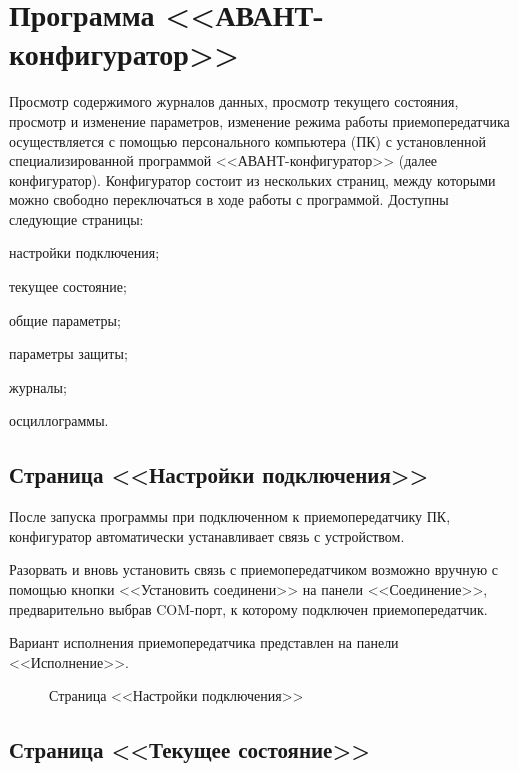 \section{Программа <<АВАНТ-конфигуратор>>}	\label{sec:configurator}

Просмотр содержимого журналов данных, просмотр текущего состояния, просмотр и изменение параметров, изменение режима работы приемопередатчика осуществляется с помощью персонального компьютера (ПК) с установленной специализированной программой <<АВАНТ-конфигуратор>> (далее конфигуратор).  Конфигуратор состоит из нескольких страниц, между которыми можно свободно переключаться в ходе работы с программой. Доступны следующие страницы:
\begin{list}{--}{}
\item настройки подключения;
\item текущее состояние;
\item общие параметры;
\item параметры защиты;
\item журналы;
\item осциллограммы.
\end{list}

	
\subsection{Страница <<Настройки подключения>>}	\label{ssec:configurator_connect}

После запуска программы при подключенном к приемопередатчику ПК, конфигуратор автоматически устанавливает связь с устройством. 

Разорвать и вновь установить связь с приемопередатчиком возможно вручную с помощью кнопки <<Установить соединени>> на панели <<Соединение>>, предварительно выбрав COM-порт, к которому подключен приемопередатчик. 

Вариант исполнения приемопередатчика представлен на панели <<Исполнение>>. 
	
\begin{figure}[H]
	
	\caption{Страница <<Настройки подключения>>}
	\label{fig:configurator_connect}
\end{figure}	
	
	
\subsection{Страница <<Текущее состояние>>}	\label{ssec:configurator_state}
	
